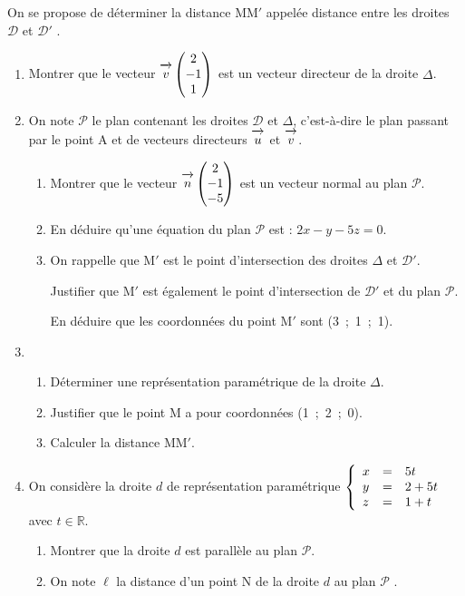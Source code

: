 \documentclass[11pt]{article}
\newcommand{\R}{\mathbb{R}}
\newcommand{\vect}[1]{\overrightarrow{\,\mathstrut#1\,}}
\begin{document}
On se propose de déterminer la distance MM$'$ appelée \og distance entre les droites $\mathcal{D}$ et $\mathcal{D}'$ \fg.
\begin{enumerate}[resume]
\item Montrer que le vecteur $\vect{v}\begin{pmatrix}2\\- 1\\1\end{pmatrix}$ est un vecteur directeur de la droite $\Delta$.
\item On note $\mathcal{P}$ le plan contenant les droites $\mathcal{D}$ et $\Delta$, c'est-à-dire le plan passant par le point A et de vecteurs directeurs $\vect{u}$ et $\vect{v}$.
	\begin{enumerate}
		\item Montrer que le vecteur $\vect{n}\begin{pmatrix}2\\-1\\-5 \end{pmatrix}$ est un vecteur normal au plan $\mathcal{P}$.
		\item En déduire qu'une équation du plan $\mathcal{P}$ est : $2x - y - 5z = 0$.
		\item On rappelle que M$'$ est le point d'intersection des droites $\Delta$ et $\mathcal{D}'$.
		
Justifier que M$'$ est également le point d'intersection de $\mathcal{D}'$ et du plan $\mathcal{P}$.
		
En déduire que les coordonnées du point M$'$ sont (3~;~1~;~1).
	\end{enumerate}
\item 
	\begin{enumerate}
		\item Déterminer une représentation paramétrique de la droite $\Delta$.
		\item Justifier que le point M a pour coordonnées (1~;~2~;~0).
		\item Calculer la distance MM$'$.
	\end{enumerate}
\item On considère la droite $d$ de représentation paramétrique $\left\{\begin{array}{l c l}
x &=& 5t\\y &=& 2 + 5t \\z&=&1 + t\end{array}\right.$ avec $t \in \R$.
	\begin{enumerate}
		\item Montrer que la droite $d$ est parallèle au plan $\mathcal{P}$.
		\item On note $\ell$ la distance d'un point N de la droite $d$ au plan $\mathcal{P}$ . 
		

\end{enumerate}
\end{enumerate}
\end{document}
